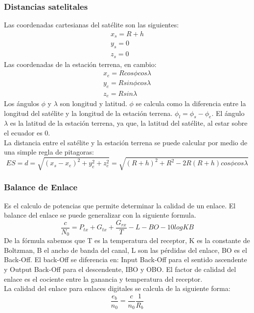 	\subsubsection{Distancias satelitales}
	\label{ssub:distSatelite}
		Las coordenadas cartesianas del satélite son las siguientes: 
		\begin{gather*}
			x_s=R+h\\
			y_s=0\\
			z_s=0
		\end{gather*}
		Las coordenadas de la estación terrena, en cambio:
		\begin{gather*}
			x_e=Rcos\phi cos\lambda\\
			y_e=Rsin\phi cos\lambda\\
			z_e=Rsin\lambda
		\end{gather*}
		Los ángulos $\phi$ y $\lambda$ son longitud y latitud. $\phi$ se calcula como la diferencia entre la longitud del satélite y la longitud de la estación terrena. $\phi_l=\phi_s-\phi_e$. El ángulo $\lambda$ es la latitud de la estación terrena, ya que, la latitud del satélite, al estar sobre el ecuador es 0.\\
		La distancia entre el satélite y la estación terrena se puede calcular por medio de una simple regla de pitagoras:
		\[ES=d=\sqrt{(x_s-x_e)^2+y_e^2+z_e^2}=\sqrt{(R+h)^2+R^2-2R(R+h)cos\phi cos\lambda}\]
	\subsubsection{Balance de Enlace}
	\label{ssub:balance}
		Es el calculo de potencias que permite determinar la calidad de un enlace. El balance del enlace se puede generalizar con la siguiente formula.
		\[\frac{c}{N_0}=P_{tx}+G_{tx}+\frac{G_{rx}}{T}-L-BO-10logKB\]
		De la fórmula sabemos que T es la temperatura del receptor, K es la constante de Boltzman, B el ancho de banda del canal, L son las pérdidas del enlace, BO es el Back-Off. El back-Off se diferencia en: Input Back-Off para el sentido ascendente y Output Back-Off para el descendente, IBO y OBO. El factor de calidad del enlace es el cociente entre la ganancia y temperatura del receptor.\\
		La calidad del enlace para enlaces digitales se calcula de la siguiente forma:
		\[\frac{e_b}{n_0}=\frac{c}{n_0}\frac{1}{R_b}\]
